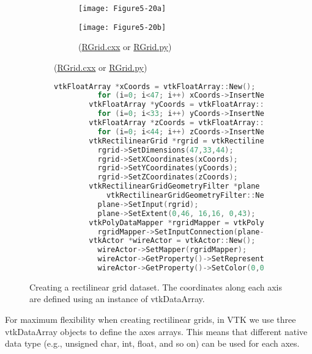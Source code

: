 \begin{description}[leftmargin=0cm,labelindent=0cm]
\begin{figure}[!htb]
    \centering
    \begin{subfigure}[h]{0.96\linewidth}
    	\begin{subfigure}[h]{0.48\linewidth}
    		\texttt{[image: Figure5-20a]}
    		\caption*{}
    		\label{fig:Figure5-20a}
    	\end{subfigure}
    	\hfill
    	\begin{subfigure}[h]{0.48\linewidth}
    		\texttt{[image: Figure5-20b]}
    		\caption*{(\href{https://lorensen.github.io/VTKExamples/site/Cxx/RectilinearGrid/RGrid/}{RGrid.cxx} or \href{https://lorensen.github.io/VTKExamples/site/Python/RectilinearGrid/RGrid/}{RGrid.py})}
    		\label{fig:Figure5-20b}
    	\end{subfigure}
	\end{subfigure}
	\hfill
	\begin{subfigure}[h]{0.76\linewidth}
		\begin{lstlisting}[language=C++, caption={}]
		vtkFloatArray *xCoords = vtkFloatArray::New();
		  for (i=0; i<47; i++) xCoords->InsertNextValue(i,x[i]);
		vtkFloatArray *yCoords = vtkFloatArray::New();
		  for (i=0; i<33; i++) yCoords->InsertNextValue(i,y[i]);
		vtkFloatArray *zCoords = vtkFloatArray::New();
		  for (i=0; i<44; i++) zCoords->InsertNextValue(i,z[i]);
		vtkRectilinearGrid *rgrid = vtkRectilinearGrid::New();
		  rgrid->SetDimensions(47,33,44);
		  rgrid->SetXCoordinates(xCoords);
		  rgrid->SetYCoordinates(yCoords);
		  rgrid->SetZCoordinates(zCoords);
		vtkRectilinearGridGeometryFilter *plane =
		    vtkRectilinearGridGeometryFilter::New();
		  plane->SetInput(rgrid);
		  plane->SetExtent(0,46, 16,16, 0,43);
		vtkPolyDataMapper *rgridMapper = vtkPolyDataMapper::New();
		  rgridMapper->SetInputConnection(plane->GetOutputPort());
		vtkActor *wireActor = vtkActor::New();
		  wireActor->SetMapper(rgridMapper);
		  wireActor->GetProperty()->SetRepresentationToWireframe();
		  wireActor->GetProperty()->SetColor(0,0,0);
		\end{lstlisting}
		\caption*{}
		\label{fig:Figure5-20c}
	\end{subfigure}
	\caption{Creating a rectilinear grid dataset. The coordinates along each axis are defined using an instance of vtkDataArray.}\label{fig:Figure5-20}
\end{figure}

For maximum flexibility when creating rectilinear grids, in VTK we use three vtkDataArray objects to define the axes arrays. This means that different native data type (e.g., unsigned char, int, float, and so on) can be used for each axes.


\end{description}
